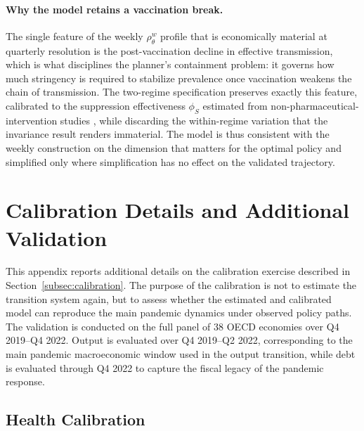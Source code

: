 \documentclass[12pt, a4paper]{article}
\begin{document}
\paragraph{Why the model retains a vaccination break.}
The single feature of the weekly $\rho_\theta^w$ profile that is economically
material at quarterly resolution is the post-vaccination decline in effective
transmission, which is what disciplines the planner's containment problem: it
governs how much stringency is required to stabilize prevalence once
vaccination weakens the chain of transmission. The two-regime specification
preserves exactly this feature, calibrated to the suppression effectiveness
$\phi_S$ estimated from non-pharmaceutical-intervention studies
\citep{brauner2021,flaxman2020}, while discarding the within-regime variation
that the invariance result renders immaterial. The model is thus consistent
with the weekly construction on the dimension that matters for the optimal
policy and simplified only where simplification has no effect on the validated
trajectory.




\section{Calibration Details and Additional Validation}
\label{app:calibration}

This appendix reports additional details on the calibration exercise described in Section~\ref{subsec:calibration}. The purpose of the calibration is not to estimate the transition system again, but to assess whether the estimated and calibrated model can reproduce the main pandemic dynamics under observed policy paths. The validation is conducted on the full panel of 38 OECD economies over Q4 2019--Q4 2022. Output is evaluated over Q4 2019--Q2 2022, corresponding to the main pandemic macroeconomic window used in the output transition, while debt is evaluated through Q4 2022 to capture the fiscal legacy of the pandemic response.

\subsection{Health Calibration}
\end{document}
